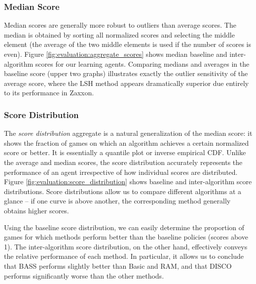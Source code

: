 \documentclass[twoside,11pt]{article}
\newcommand{\gamename}[1]{{\sc #1}}
\begin{document}
\subsubsection{Median Score}

Median scores are generally more robust to outliers than average scores. The median is obtained by sorting all normalized scores and selecting the middle element (the average of the two middle elements is used if the number of scores is even). Figure \ref{fig:evaluation:aggregate_scores} shows median baseline and inter-algorithm scores for our learning agents.  Comparing medians and averages in the baseline score (upper two graphs) illustrates exactly the outlier sensitivity of the average score, where the LSH method appears dramatically superior due entirely to its performance in \gamename{Zaxxon}.  

\subsubsection{Score Distribution}

The \emph{score distribution} aggregate is a natural generalization of the median score: it shows the fraction of games on which an algorithm achieves a certain normalized score or better.  It is essentially a quantile plot or inverse empirical CDF. Unlike the average and median scores, the score distribution accurately represents the performance of an agent irrespective of how individual scores are distributed. 
Figure \ref{fig:evaluation:score_distribution} shows baseline and inter-algorithm score distributions. 
Score distributions allow us to compare different algorithms at a glance -- if one curve is above another, the corresponding method generally obtains higher scores. 

Using the baseline score distribution, we can easily determine the proportion of games for which methods perform better than the baseline policies (scores above 1). The inter-algorithm score distribution, on the other hand, effectively conveys the relative performance of each method. 
In particular, it allows us to conclude that BASS performs slightly better than Basic and RAM, and that DISCO performs significantly worse than the other methods.
\end{document}
